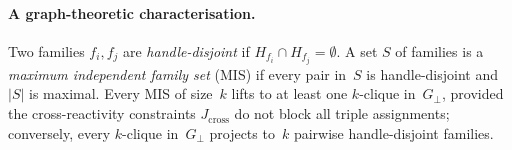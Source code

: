 \documentclass[preprint,12pt]{elsarticle}
\theoremstyle{definition}
\theoremstyle{remark}
\begin{document}
\begin{table}[h!]
\centering
\caption{Available handles per maximum independent set.  A new family
  using handles exclusively from this pool extends the MIS to size~5.}
\label{tab:available}
\end{table}

\paragraph{A graph-theoretic characterisation.}

Two families $f_i, f_j$ are \emph{handle-disjoint} if
$H_{f_i} \cap H_{f_j} = \emptyset$.  A set $S$ of families is a
\emph{maximum independent family set} (MIS) if every pair in~$S$
is handle-disjoint and $|S|$ is maximal.  Every MIS of size~$k$
lifts to at least one $k$-clique in~$G_\perp$, provided the
cross-reactivity constraints $J_{\mathrm{cross}}$ do not block all
triple assignments; conversely, every $k$-clique in~$G_\perp$
projects to~$k$ pairwise handle-disjoint families.
\end{document}
